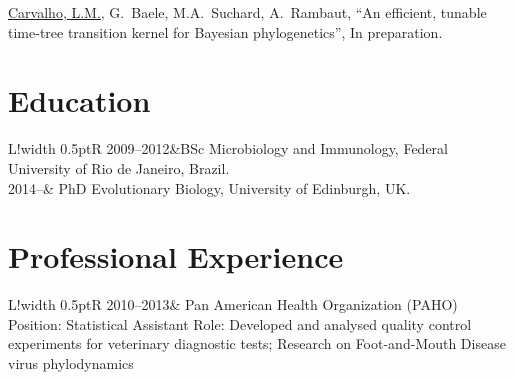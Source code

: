 \documentclass[10pt]{article}
\newcommand\VRule{\color{lightgray}\vrule width 0.5pt}
\begin{document}
\underline{Carvalho, L.M.}, G.~Baele, M.A.~Suchard, A.~Rambaut, ``{A}n efficient, tunable time-tree transition kernel for Bayesian phylogenetics'', In preparation.

\newpage
\section*{Education}
\begin{tabular}{L!{\VRule}R}
2009--2012&BSc Microbiology and Immunology, Federal University of Rio de Janeiro, Brazil.\\
2014--& PhD Evolutionary Biology, University of Edinburgh, UK.
\end{tabular}

\section*{Professional Experience}
\begin{tabular}{L!{\VRule}R}
2010--2013&{
Pan American Health Organization (PAHO)\newline
Position: Statistical Assistant\newline
Role: Developed and analysed quality control experiments for veterinary diagnostic tests;\newline
Research on Foot-and-Mouth Disease virus phylodynamics 
}
\end{tabular}
\end{document}
